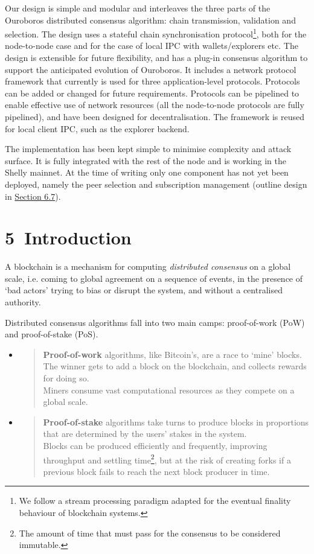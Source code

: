 \documentclass[]{article}
\begin{document}
Our design is simple and modular and interleaves the three parts of the
Ouroboros distributed consensus algorithm: chain transmission,
validation and selection. The design uses a stateful chain
synchronisation protocol\footnote{We follow a stream processing paradigm
  adapted for the eventual finality behaviour of blockchain systems.},
both for the node-to-node case and for the case of local IPC with
wallets/explorers etc. The design is extensible for future flexibility,
and has a plug-in consensus algorithm to support the anticipated
evolution of Ouroboros. It includes a network protocol framework that
currently is used for three application-level protocols. Protocols can
be added or changed for future requirements. Protocols can be pipelined
to enable effective use of network resources (all the node-to-node
protocols are fully pipelined), and have been designed for
decentralisation. The framework is reused for local client IPC, such as
the explorer backend.

The implementation has been kept simple to minimise complexity and
attack surface. It is fully integrated with the rest of the node and is
working in the Shelly mainnet. At the time of writing only one component
has not yet been deployed, namely the peer selection and subscription
management (outline design in
\protect\hyperlink{decentralisation-design}{{Section 6.7}}).

\hypertarget{introduction}{%
\section{​5​~Introduction}\label{introduction}}

A blockchain is a mechanism for computing \emph{distributed consensus}
on a global scale, i.e. coming to global agreement on a sequence of
events, in the presence of `bad actors' trying to bias or disrupt the
system, and without a centralised authority.

Distributed consensus algorithms fall into two main camps: proof-of-work
(PoW) and proof-of-stake (PoS).

\begin{itemize}
\item
  \begin{quote}
  \textbf{Proof-of-work} algorithms, like Bitcoin's, are a race to
  `mine' blocks. The winner gets to add a block on the blockchain, and
  collects rewards for doing so.\\
  Miners consume vast computational resources as they compete on a
  global scale.
  \end{quote}
\item
  \begin{quote}
  \textbf{Proof-of-stake} algorithms take turns to produce blocks in
  proportions that are determined by the users' stakes in the system.\\
  Blocks can be produced efficiently and frequently, improving
  throughput and settling time\footnote{The amount of time that must
    pass for the consensus to be considered immutable.}, but at the risk
  of creating forks if a previous block fails to reach the next block
  producer in time.
  \end{quote}
\end{itemize}
\end{document}
